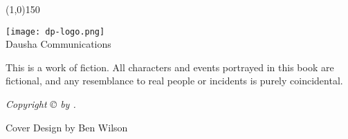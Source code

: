 \frontmatter
  \begin{titlingpage}
  \pagestyle{empty}
  \begin{center}
  \vspace*{\fill}

  \HUGE\textbf{\textsf\thetitle}

  \vspace*{0.25in}
  \line(1,0){150}
  \vspace*{0.25in}

  \Large\textsf\theauthor

  \vspace*{\fill}

  \vspace*{\fill}
  \texttt{[image: dp-logo.png]}\\[0cm]
  \hspace*{\fill}\textsf{Dausha}\hspace*{\fill}\newline%
  \textsf{Communications}
  \end{center}
  \end{titlingpage}

  \vspace*{\fill}
  \pagestyle{empty}

  \par\noindent\emph{\thetitle}
  \newline
  
  \par\noindent This is a work of fiction. All characters and events portrayed in this
  book are fictional, and any resemblance to real people or incidents is
  purely coincidental.\newline

  \par\noindent\emph{Copyright \copyright{} \yearonly{} by \theauthor.}\newline
  
  \par\noindent Cover Design by Ben Wilson\newline

